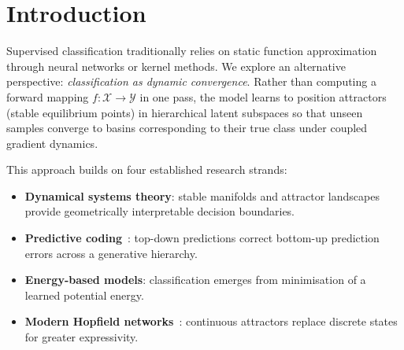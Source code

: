 \documentclass[11pt,a4paper]{article}
\begin{document}
\begin{abstract}
\textbf{Positioning.} HAML sits at the intersection of four established research
strands --- supervised attractor-based classification, hierarchical Predictive Coding,
hierarchical associative memories, and implicit-depth/equilibrium models. We do not
claim novelty for any individual building block. Our contribution is a specific
instantiation combining (a) supervised classification by basin membership, (b) a
hierarchy of PCA-decomposed subspaces, (c) continuous attractors learned by gradient
descent at every level, and (d) bidirectional PC-style coupling between adjacent levels,
together with theoretical results specialised to this architecture. Detailed
positioning with respect to prior work is provided in Section~\ref{sec:related}.

\textbf{Keywords:} Supervised learning, attractor dynamics, hierarchical classification,
neural ODE, predictive coding, energy-based models, dynamical systems.
\end{abstract}

\section{Introduction}

Supervised classification traditionally relies on static function approximation through
neural networks or kernel methods. We explore an alternative perspective:
\emph{classification as dynamic convergence}. Rather than computing a forward mapping
$f : \mathcal{X} \to \mathcal{Y}$ in one pass, the model learns to position attractors
(stable equilibrium points) in hierarchical latent subspaces so that unseen samples
converge to basins corresponding to their true class under coupled gradient dynamics.

This approach builds on four established research strands:
\begin{itemize}
  \item \textbf{Dynamical systems theory}: stable manifolds and attractor landscapes provide
        geometrically interpretable decision boundaries.
  \item \textbf{Predictive coding}~\cite{rao1999predictive,friston2005theory}: top-down
        predictions correct bottom-up prediction errors across a generative hierarchy.
  \item \textbf{Energy-based models}: classification emerges from minimisation of a learned
        potential energy.
  \item \textbf{Modern Hopfield networks}~\cite{ramsauer2021hopfield}: continuous attractors
        replace discrete states for greater expressivity.
\end{itemize}
\end{document}
